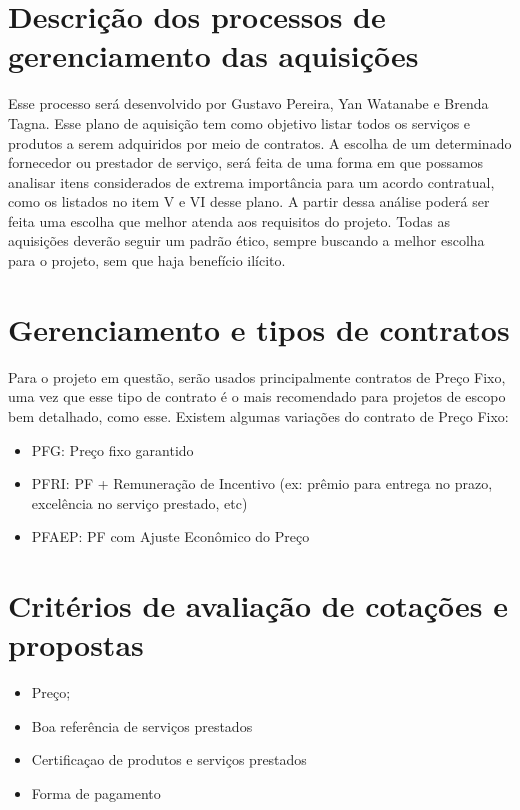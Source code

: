 \section{Descrição dos processos de gerenciamento das aquisições}
  Esse processo será desenvolvido por Gustavo Pereira, Yan Watanabe e Brenda Tagna. Esse plano de aquisição tem como objetivo listar todos os serviços e produtos a serem adquiridos por meio de contratos. 
A escolha de um determinado fornecedor ou prestador de serviço, será feita de uma forma em que possamos analisar itens considerados de extrema importância para um acordo contratual, como os listados no item V e VI desse plano. A partir dessa análise poderá ser feita uma escolha que melhor atenda aos requisitos do projeto. 
Todas as aquisições deverão seguir um padrão ético, sempre buscando a melhor escolha para o projeto, sem que haja benefício ilícito. 

   
\section{Gerenciamento e tipos de contratos}
Para o projeto em questão, serão usados principalmente contratos de Preço Fixo, uma vez que esse tipo de contrato é o mais recomendado para projetos de escopo bem detalhado, como esse. 
Existem algumas variações do contrato de Preço Fixo:
\begin{itemize}

\item PFG: Preço fixo garantido
\item PFRI: PF + Remuneração de Incentivo (ex: prêmio para entrega no prazo, excelência no serviço prestado, etc)
\item PFAEP: PF com Ajuste Econômico do Preço
\end{itemize}

\section{Critérios de avaliação de cotações e propostas}
\begin{itemize}
\item Preço;
\item Boa referência de serviços prestados
\item Certificaçao de produtos e serviços prestados
\item Forma de pagamento
\end{itemize}


